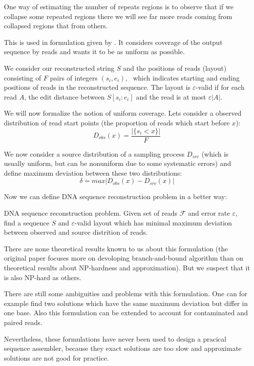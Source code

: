 \bigskip

One way of estimating the number of repeats regions is to observe
that if we collapse some repeated regions there we will see far
more reads coming from collapsed regions that from others. 

This is used in formulation given by \citet{myers1995toward}. It considers
coverage of the output sequence by reads and wants it to be as uniform as possible.

We consider our reconstructed string $S$ and the positions of reads (layout)
consisting of $F$ pairs of integers $(s_i, e_i)$,
\ which indicates starting and ending positions
of reads in the reconstructed sequence. The layout is $\varepsilon$-valid
if for each read $A$, the edit distance between $S[s_i:e_i]$ and the read
is at most $\varepsilon |A|$.

We will now formalize the notion of uniform coverage. Lets consider a observed
distribution of read start points (the proportion of reads which start before $x$):
$$D_{obs}(x) = \frac{|\{s_i < x\}|}{F}$$

We now consider a source distribution of a sampling process $D_{src}$ (which is usually
uniform, but can be nonuniform due to some systematic errors) and define maximum
deviation between these two distributions:
$$\delta = max |D_{obs}(x) - D_{src}(x)|$$

Now we can define DNA sequence reconstruction problem in a better way:

\begin{definition}{DNA sequence reconstruction problem.}
Given set of reads $\mathcal{F}$ and error rate $\varepsilon$, find
a sequence $S$ and $\varepsilon$-valid layout which has minimal
maximum deviation between observed and source distrition of reads.
\end{definition}

There are none theoretical results known to us about this formulation
(the original paper focuses more on devoloping branch-and-bound algorithm
than on theoretical results about NP-hardness and approximation).
But we suspect that it is also NP-hard as others.

There are still some ambiguities and problems with this formulation.
One can for example find two solutions which have the same maximum deviation
but differ in one base.
Also this formulation can be extended to account for contaminated and paired
reads.

Nevertheless, these formulations have never been used to design
a pracical sequence assembler, because they exact solutions are too slow
and approximate solutions are not good for practice.

